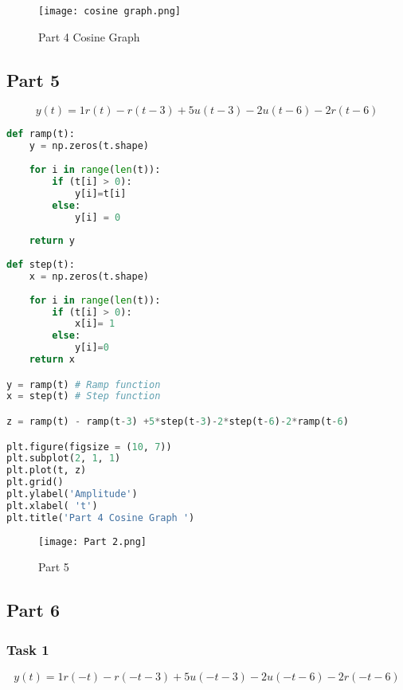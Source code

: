 \documentclass[11pt,a4]{report}
\begin{document}
\begin{figure}[h!]
    \begin{center}
  \caption{Part 4 Cosine Graph}
  \texttt{[image: cosine graph.png]}
\end{center}
\end{figure}
\newpage
\subsection{Part 5}
\begin{equation}
    y(t) = 1r(t) -r(t-3) + 5u(t-3)-2u(t-6) - 2r(t-6)
\end{equation}

\begin{lstlisting}[language=Python]
def ramp(t):
    y = np.zeros(t.shape)
    
    for i in range(len(t)):
        if (t[i] > 0):
            y[i]=t[i]
        else: 
            y[i] = 0
    
    return y
        
def step(t):
    x = np.zeros(t.shape)
    
    for i in range(len(t)):
        if (t[i] > 0):
            x[i]= 1
        else:
            y[i]=0
    return x

y = ramp(t) # Ramp function
x = step(t) # Step function

z = ramp(t) - ramp(t-3) +5*step(t-3)-2*step(t-6)-2*ramp(t-6)

plt.figure(figsize = (10, 7))
plt.subplot(2, 1, 1)
plt.plot(t, z)
plt.grid()
plt.ylabel('Amplitude')
plt.xlabel( 't')
plt.title('Part 4 Cosine Graph ')
\end{lstlisting}

\begin{figure}[h!]
    \begin{center}
  \caption{Part 5}
  \texttt{[image: Part 2.png]}
\end{center}
\end{figure}
\newpage

\subsection{Part 6}

\subsubsection{Task 1}


\begin{equation}
    y(t) = 1r(-t) -r(-t-3) + 5u(-t-3)-2u(-t-6) - 2r(-t-6)
\end{equation}
\end{document}
